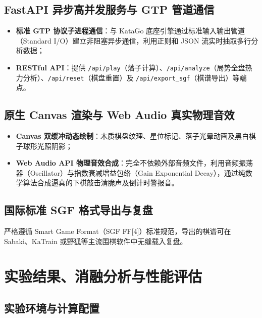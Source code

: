 \documentclass[11pt,a4paper]{ctexart}
\begin{document}
\subsection{FastAPI 异步高并发服务与 GTP 管道通信}

\begin{itemize}
  \item \textbf{标准 GTP 协议子进程通信}：与 KataGo 底座引擎通过标准输入输出管道（Standard I/O）建立非阻塞异步通信，利用正则和 JSON 流实时抽取多行分析数据；
  \item \textbf{RESTful API}：提供 \texttt{/api/play}（落子计算）、\texttt{/api/analyze}（局势全盘热力分析）、\texttt{/api/reset}（棋盘重置）及 \texttt{/api/export\_sgf}（棋谱导出）等端点。
\end{itemize}

\subsection{原生 Canvas 渲染与 Web Audio 真实物理音效}

\begin{itemize}
  \item \textbf{Canvas 双缓冲动态绘制}：木质棋盘纹理、星位标记、落子光晕动画及黑白棋子球形光照阴影；
  \item \textbf{Web Audio API 物理音效合成}：完全不依赖外部音频文件，利用音频振荡器（Oscillator）与指数衰减增益包络（Gain Exponential Decay），通过纯数学算法合成逼真的下棋敲击清脆声及倒计时警报音。
\end{itemize}

\subsection{国际标准 SGF 格式导出与复盘}

严格遵循 Smart Game Format（SGF FF[4]）标准规范，导出的棋谱可在 Sabaki、KaTrain 或野狐等主流围棋软件中无缝载入复盘。

\newpage
\section{实验结果、消融分析与性能评估}

\subsection{实验环境与计算配置}
\end{document}
